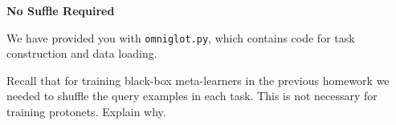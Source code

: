 \item {} {\bf No Suffle Required}

We have provided you with \texttt{omniglot.py}, which contains code for task construction and data loading.

Recall that for training black-box meta-learners in the previous homework we needed to shuffle the query examples in each task. This is not necessary for training protonets. Explain why.